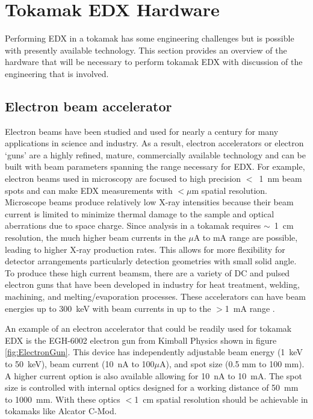 \documentclass[12pt,letterpaper,final]{article}
\begin{document}
\section{Tokamak EDX Hardware}

Performing EDX in a tokamak has some engineering challenges but is possible with presently available technology. This section provides an overview of the hardware that will be necessary to perform tokamak EDX with discussion of the engineering that is involved.

\subsection{Electron beam accelerator}
\label{sec:ElectronGun}

Electron beams have been studied and used for nearly a century for many applications in science and industry. As a result, electron accelerators or electron `guns' are a highly refined, mature, commercially available technology and can be built with beam parameters spanning the range necessary for EDX. For example, electron beams used in microscopy are focused to high precision $<$~1~nm beam spots and can make EDX measurements with $<\mu$m spatial resolution. Microscope beams produce relatively low X-ray intensities because their beam current is limited to minimize thermal damage to the sample and optical aberrations due to space charge. Since analysis in a tokamak requires $\sim$~1~cm resolution, the much higher beam currents in the $\mu$A to mA range are possible, leading to higher X-ray production rates.  This allows for more flexibility for detector arrangements particularly detection geometries with small solid angle. To produce these high current beamsm, there are a variety of DC and pulsed electron guns that have been developed in industry for heat treatment, welding, machining, and melting/evaporation processes. These accelerators can have beam energies up to 300~keV with beam currents in up to the $>$1~mA range \cite{HammHamm}.

An example of an electron accelerator that could be readily used for tokamak EDX is the EGH-6002 electron gun from Kimball Physics \cite{KimballPhysics} shown in figure \ref{fig:ElectronGun}. This device has independently adjustable beam energy (1~keV to 50~keV), beam current (10~nA to 100$\mu$A), and spot size (0.5 mm to 100 mm). A higher current option is also available allowing for 10~nA to 10~mA. The spot size is controlled with internal optics designed for a working distance of 50~mm to 1000~mm. With these optics $<$1~cm spatial resolution should be achievable in tokamaks like Alcator C-Mod.
\end{document}
